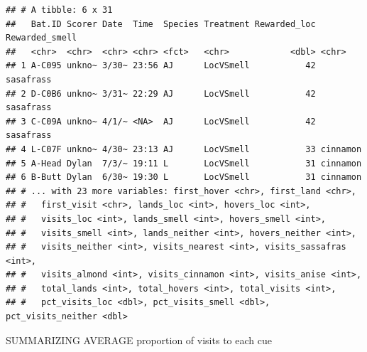 \documentclass[]{article}
\newenvironment{Shaded}{\begin{snugshade}}{\end{snugshade}}
\newcommand{\KeywordTok}[1]{\textcolor[rgb]{0.13,0.29,0.53}{\textbf{{#1}}}}
\newcommand{\DataTypeTok}[1]{\textcolor[rgb]{0.13,0.29,0.53}{{#1}}}
\newcommand{\StringTok}[1]{\textcolor[rgb]{0.31,0.60,0.02}{{#1}}}
\newcommand{\CommentTok}[1]{\textcolor[rgb]{0.56,0.35,0.01}{\textit{{#1}}}}
\newcommand{\OtherTok}[1]{\textcolor[rgb]{0.56,0.35,0.01}{{#1}}}
\newcommand{\NormalTok}[1]{{#1}}
\begin{document}
\begin{verbatim}
## # A tibble: 6 x 31
##   Bat.ID Scorer Date  Time  Species Treatment Rewarded_loc Rewarded_smell
##   <chr>  <chr>  <chr> <chr> <fct>   <chr>            <dbl> <chr>         
## 1 A-C095 unkno~ 3/30~ 23:56 AJ      LocVSmell           42 sasafrass     
## 2 D-C0B6 unkno~ 3/31~ 22:29 AJ      LocVSmell           42 sasafrass     
## 3 C-C09A unkno~ 4/1/~ <NA>  AJ      LocVSmell           42 sasafrass     
## 4 L-C07F unkno~ 4/30~ 23:13 AJ      LocVSmell           33 cinnamon      
## 5 A-Head Dylan  7/3/~ 19:11 L       LocVSmell           31 cinnamon      
## 6 B-Butt Dylan  6/30~ 19:30 L       LocVSmell           31 cinnamon      
## # ... with 23 more variables: first_hover <chr>, first_land <chr>,
## #   first_visit <chr>, lands_loc <int>, hovers_loc <int>,
## #   visits_loc <int>, lands_smell <int>, hovers_smell <int>,
## #   visits_smell <int>, lands_neither <int>, hovers_neither <int>,
## #   visits_neither <int>, visits_nearest <int>, visits_sassafras <int>,
## #   visits_almond <int>, visits_cinnamon <int>, visits_anise <int>,
## #   total_lands <int>, total_hovers <int>, total_visits <int>,
## #   pct_visits_loc <dbl>, pct_visits_smell <dbl>, pct_visits_neither <dbl>
\end{verbatim}

\begin{Shaded}
\end{Shaded}

SUMMARIZING AVERAGE proportion of visits to each cue

\begin{Shaded}
\end{Shaded}
\end{document}
